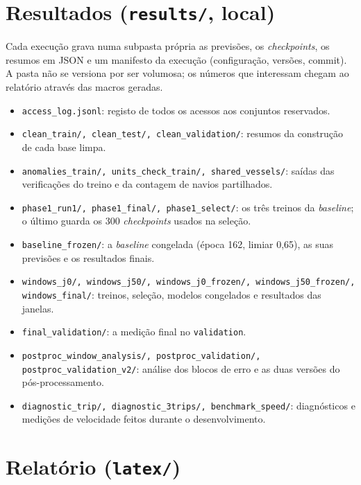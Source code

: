 \documentclass[11pt,a4paper]{article}
\newcommand{\f}[1]{\texttt{#1}}
\begin{document}
\section{Resultados (\f{results/}, local)}\label{sec:resultados}

Cada execução grava numa subpasta própria as previsões, os \emph{checkpoints}, os resumos em JSON e
um manifesto da execução (configuração, versões, commit). A pasta não se versiona por ser volumosa;
os números que interessam chegam ao relatório através das macros geradas.

\begin{itemize}
\item \texttt{access\_log.jsonl}: registo de todos os acessos aos conjuntos reservados.
\item \texttt{clean\_train/, clean\_test/, clean\_validation/}: resumos da construção de cada base limpa.
\item \texttt{anomalies\_train/, units\_check\_train/, shared\_vessels/}: saídas das verificações do treino e
  da contagem de navios partilhados.
\item \texttt{phase1\_run1/, phase1\_final/, phase1\_select/}: os três treinos da \emph{baseline}; o último
  guarda os 300 \emph{checkpoints} usados na seleção.
\item \texttt{baseline\_frozen/}: a \emph{baseline} congelada (época 162, limiar 0,65), as suas previsões e
  os resultados finais.
\item \texttt{windows\_j0/, windows\_j50/, windows\_j0\_frozen/, windows\_j50\_frozen/, windows\_final/}: treinos, seleção, modelos congelados e resultados das janelas.
\item \texttt{final\_validation/}: a medição final no \f{validation}.
\item \texttt{postproc\_window\_analysis/, postproc\_validation/, postproc\_validation\_v2/}: análise dos
  blocos de erro e as duas versões do pós-processamento.
\item \texttt{diagnostic\_trip/, diagnostic\_3trips/, benchmark\_speed/}: diagnósticos e medições de
  velocidade feitos durante o desenvolvimento.
\end{itemize}

\section{Relatório (\f{latex/})}\label{sec:latex}
\end{document}
